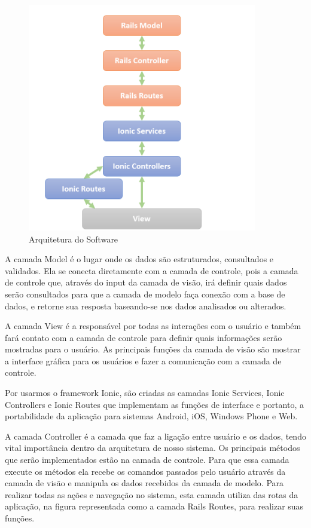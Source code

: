 \begin{figure}[!h]
\caption{Arquitetura do Software}
\label{fig:arquitetura}
\centering
\includegraphics[width=10cm]{figuras/tecnologias}
\end{figure}

\par A camada Model é o lugar onde os dados são estruturados, consultados e validados. Ela se conecta diretamente com a camada de controle, pois a camada de controle que, através do input da camada de visão, irá definir quais dados serão consultados para que a camada de modelo faça conexão com a base de dados, e retorne sua resposta baseando-se nos dados analisados ou alterados.
\par A camada View é a responsável por todas as interações com o usuário e também fará contato com a camada de controle para definir quais informações serão mostradas para o usuário. As principais funções da camada de visão são mostrar a interface gráfica para os usuários e fazer a comunicação com a camada de controle.
\par Por usarmos o framework Ionic, são criadas as camadas Ionic Services, Ionic Controllers e Ionic Routes que implementam as funções de interface e portanto, a portabilidade da aplicação para sistemas Android, iOS, Windows Phone e Web.
\par A camada Controller é a camada que faz a ligação entre usuário e os dados, tendo vital importância dentro da arquitetura de nosso sistema. Os principais métodos que serão implementados estão na camada de controle. Para que essa camada execute os métodos ela recebe os comandos passados pelo usuário através da camada de visão e manipula os dados recebidos da camada de modelo. Para realizar todas as ações e navegação no sistema, esta camada utiliza das rotas da aplicação, na figura representada como a camada Rails Routes, para realizar suas funções.

